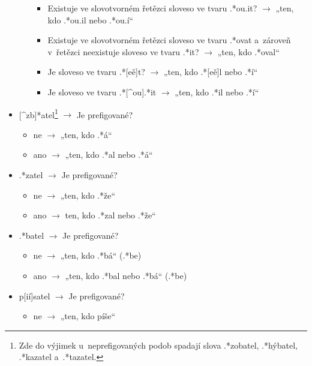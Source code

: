 \begin{itemize}
\begin{itemize}
    \begin{itemize}
    \tightlist
    \item
      Existuje ve slovotvorném řetězci sloveso ve tvaru .*ou.it?
      $\rightarrow$ „ten, kdo .*ou.il nebo .*ou.í``
    \item
      Existuje ve slovotvorném řetězci sloveso ve tvaru .*ovat a~zároveň
      v~řetězci neexistuje sloveso ve tvaru .*it? $\rightarrow$ „ten,
      kdo .*oval``
    \item
      Je sloveso ve tvaru .*{[}eě{]}t? $\rightarrow$ „ten, kdo
      .*{[}eě{]}l nebo .*í``
    \item
      Je sloveso ve tvaru .*{[}\^{}ou{]}.*it $\rightarrow$ „ten, kdo
      .*il nebo .*í``
    \end{itemize}
  \end{itemize}
\item
  {[}\^{}zb{]}*atel\footnote{Zde do výjimek u~neprefigovaných podob spadají slova .*zobatel, .*hýbatel, .*kazatel a~.*tazatel.}
  $\rightarrow$ Je prefigované?

  \begin{itemize}
  \tightlist
  \item
    ne $\rightarrow$ „ten, kdo .*á``
  \item
    ano $\rightarrow$ „ten, kdo .*al nebo .*á``
  \end{itemize}
\item
  .*zatel $\rightarrow$ Je prefigované?

  \begin{itemize}
  \tightlist
  \item
    ne $\rightarrow$ „ten, kdo .*že``
  \item
    ano $\rightarrow$ ten, kdo .*zal nebo .*že``
  \end{itemize}
\item
  .*batel $\rightarrow$ Je prefigované?

  \begin{itemize}
  \tightlist
  \item
    ne $\rightarrow$ „ten, kdo .*bá`` (.*be)
  \item
    ano $\rightarrow$ „ten, kdo .*bal nebo .*bá`` (.*be)
  \end{itemize}
\item
  p{[}ií{]}satel $\rightarrow$ Je prefigované?

  \begin{itemize}
  \tightlist
  \item
    ne $\rightarrow$ „ten, kdo píše``
  \end{itemize}
\end{itemize}

